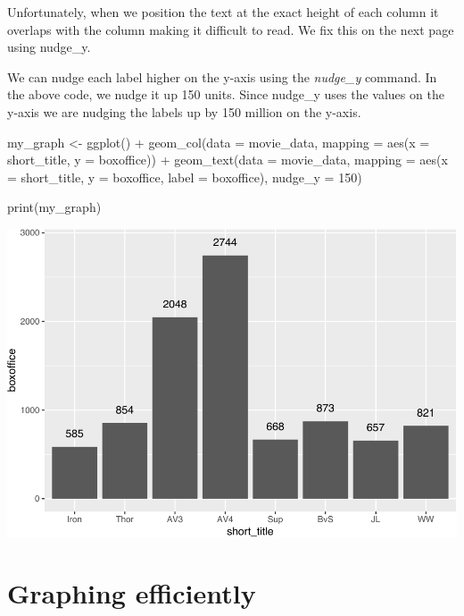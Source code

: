 \documentclass[
]{krantz}
\makeatletter
\newenvironment{Shaded}{\begin{snugshade}}{\end{snugshade}}
\newcommand{\AttributeTok}[1]{\textcolor[rgb]{0.61,0.61,0.61}{#1}}
\newcommand{\DecValTok}[1]{\textcolor[rgb]{0.06,0.06,0.06}{#1}}
\newcommand{\FunctionTok}[1]{\textcolor[rgb]{0,0,0}{#1}}
\newcommand{\NormalTok}[1]{#1}
\newcommand{\OtherTok}[1]{\textcolor[rgb]{0.37,0.37,0.37}{#1}}
\newcommand{\SpecialCharTok}[1]{\textcolor[rgb]{0,0,0}{#1}}
\newenvironment{kframe}{%
\medskip{}
\setlength{\fboxsep}{.8em}
 \def\at@end@of@kframe{}%
 \ifinner\ifhmode%
  \def\at@end@of@kframe{\end{minipage}}%
  \begin{minipage}{\columnwidth}%
 \fi\fi%
 \def\FrameCommand##1{\hskip\@totalleftmargin \hskip-\fboxsep
 \colorbox{shadecolor}{##1}\hskip-\fboxsep
     \hskip-\linewidth \hskip-\@totalleftmargin \hskip\columnwidth}%
 \MakeFramed {\advance\hsize-\width
   \@totalleftmargin\z@ \linewidth\hsize
   \@setminipage}}%
 {\par\unskip\endMakeFramed%
 \at@end@of@kframe}
\renewenvironment{Shaded}{\begin{kframe}}{\end{kframe}}
\makeatother
\begin{document}
Unfortunately, when we position the text at the exact height of each column it overlaps with the column making it difficult to read. We fix this on the next page using nudge\_y.

We can nudge each label higher on the y-axis using the \emph{nudge\_y} command. In the above code, we nudge it up 150 units. Since nudge\_y uses the values on the y-axis we are nudging the labels up by 150 million on the y-axis.

\begin{Shaded}
\begin{Highlighting}[]
\NormalTok{my\_graph }\OtherTok{\textless{}{-}} \FunctionTok{ggplot}\NormalTok{() }\SpecialCharTok{+}
  \FunctionTok{geom\_col}\NormalTok{(}\AttributeTok{data =}\NormalTok{ movie\_data,}
           \AttributeTok{mapping =} \FunctionTok{aes}\NormalTok{(}\AttributeTok{x =}\NormalTok{ short\_title, }
                         \AttributeTok{y =}\NormalTok{ boxoffice)) }\SpecialCharTok{+}
  \FunctionTok{geom\_text}\NormalTok{(}\AttributeTok{data =}\NormalTok{ movie\_data, }
           \AttributeTok{mapping =} \FunctionTok{aes}\NormalTok{(}\AttributeTok{x =}\NormalTok{ short\_title, }
                         \AttributeTok{y =}\NormalTok{ boxoffice, }
                         \AttributeTok{label =}\NormalTok{ boxoffice),}
           \AttributeTok{nudge\_y =} \DecValTok{150}\NormalTok{)}

\FunctionTok{print}\NormalTok{(my\_graph)}
\end{Highlighting}
\end{Shaded}

\includegraphics[width=0.65\linewidth]{bookdown_files/figure-latex/unnamed-chunk-200-1}

\hypertarget{graphing-efficiently}{%
\section{Graphing efficiently}\label{graphing-efficiently}}
\end{document}
